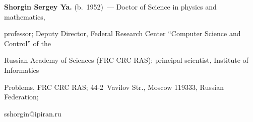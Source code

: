 \textbf{Shorgin Sergey Ya.} (b.\ 1952)~--- Doctor of Science in physics and mathematics, 


professor; Deputy Director, Federal Research Center ``Computer Science and Control'' of the 


Russian Academy of Sciences (FRC CRC RAS); principal scientist, Institute of Informatics 


Problems, FRC CRC RAS; 44-2~Vavilov Str., Moscow 119333, Russian Federation; 


\mbox{sshorgin@ipiran.ru}





\label{end\stat}








\renewcommand{\bibname}{\protect\rm Литература} 


